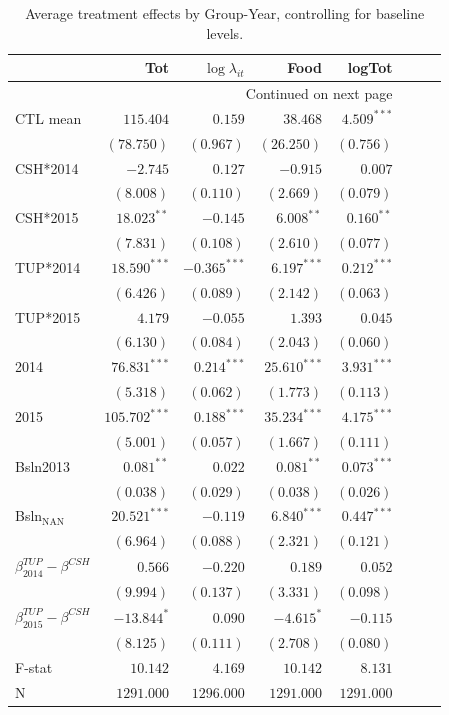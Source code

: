 \documentclass[12pt,article]{article}
\begin{document}
\begin{longtable}{lrrrrrrr}
\caption{\label{tab:consumption}Average treatment effects by Group-Year, controlling for baseline levels.}
\\
\hline
 & Tot & $\log\lambda_{it}$ & Food & logTot\\
\hline
\endhead
\hline\multicolumn{5}{r}{Continued on next page} \\
\endfoot
\endlastfoot
CTL mean & $115.404$ & $0.159$ & $38.468$ & $4.509^{***}$\\
 & $(78.750)$ & $(0.967)$ & $(26.250)$ & $(0.756)$\\
\hline
CSH*2014 & $-2.745$ & $0.127$ & $-0.915$ & $0.007$\\
 & $(8.008)$ & $(0.110)$ & $(2.669)$ & $(0.079)$\\
CSH*2015 & $18.023^{**}$ & $-0.145$ & $6.008^{**}$ & $0.160^{**}$\\
 & $(7.831)$ & $(0.108)$ & $(2.610)$ & $(0.077)$\\
TUP*2014 & $18.590^{***}$ & $-0.365^{***}$ & $6.197^{***}$ & $0.212^{***}$\\
 & $(6.426)$ & $(0.089)$ & $(2.142)$ & $(0.063)$\\
TUP*2015 & $4.179$ & $-0.055$ & $1.393$ & $0.045$\\
 & $(6.130)$ & $(0.084)$ & $(2.043)$ & $(0.060)$\\
2014 & $76.831^{***}$ & $0.214^{***}$ & $25.610^{***}$ & $3.931^{***}$\\
 & $(5.318)$ & $(0.062)$ & $(1.773)$ & $(0.113)$\\
2015 & $105.702^{***}$ & $0.188^{***}$ & $35.234^{***}$ & $4.175^{***}$\\
 & $(5.001)$ & $(0.057)$ & $(1.667)$ & $(0.111)$\\
Bsln2013 & $0.081^{**}$ & $0.022$ & $0.081^{**}$ & $0.073^{***}$\\
 & $(0.038)$ & $(0.029)$ & $(0.038)$ & $(0.026)$\\
Bsln$_{\text{NAN}}$ & $20.521^{***}$ & $-0.119$ & $6.840^{***}$ & $0.447^{***}$\\
 & $(6.964)$ & $(0.088)$ & $(2.321)$ & $(0.121)$\\
\hline
$\beta^{TUP}_{2014}-\beta^{CSH}$ & $0.566$ & $-0.220$ & $0.189$ & $0.052$\\
 & $(9.994)$ & $(0.137)$ & $(3.331)$ & $(0.098)$\\
$\beta^{TUP}_{2015}-\beta^{CSH}$ & $-13.844^{*}$ & $0.090$ & $-4.615^{*}$ & $-0.115$\\
 & $(8.125)$ & $(0.111)$ & $(2.708)$ & $(0.080)$\\
\hline
F-stat & $10.142$ & $4.169$ & $10.142$ & $8.131$\\
N & $1291.000$ & $1296.000$ & $1291.000$ & $1291.000$\\
\hline
\end{longtable}
\end{document}
